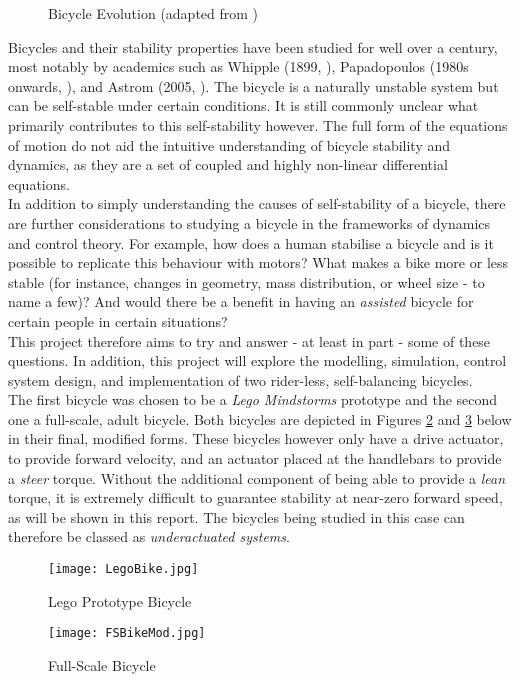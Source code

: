 \begin{figure}[H]
	\centering
    \def\svgwidth{0.9\textwidth}
    
    \caption{Bicycle Evolution (adapted from \cite{bikeevo})}
	\label{fig:bikeevo}
\end{figure}

Bicycles and their stability properties have been studied for well over a century, most notably by academics such as Whipple (1899, \cite{whipple}), Papadopoulos (1980s onwards, \cite{papadopoulos}), and Astrom (2005, \cite{astrom}). The bicycle is a naturally unstable system but can be self-stable under certain conditions. It is still commonly unclear what primarily contributes to this self-stability however. The full form of the equations of motion do not aid the intuitive understanding of bicycle stability and dynamics, as they are a set of coupled and highly non-linear differential equations. \\

\noindent In addition to simply understanding the causes of self-stability of a bicycle, there are further considerations to studying a bicycle in the frameworks of dynamics and control theory. For example, how does a human stabilise a bicycle and is it possible to replicate this behaviour with motors? What makes a bike more or less stable (for instance, changes in geometry, mass distribution, or wheel size - to name a few)? And would there be a benefit in having an \textit{assisted} bicycle for certain people in certain situations? \\

\noindent This project therefore aims to try and answer - at least in part - some of these questions. In addition, this project will explore the modelling, simulation, control system design, and implementation of two rider-less, self-balancing bicycles. \\

The first bicycle was chosen to be a \textit{Lego Mindstorms} prototype and the second one a full-scale, adult bicycle. Both bicycles are depicted in Figures \ref{fig:lego} and \ref{fig:fs} below in their final, modified forms. These bicycles however only have a drive actuator, to provide forward velocity, and an actuator placed at the handlebars to provide a \textit{steer} torque. Without the additional component of being able to provide a \textit{lean} torque, it is extremely difficult to guarantee stability at near-zero forward speed, as will be shown in this report. The bicycles being studied in this case can therefore be classed as \textit{underactuated systems}.

\vfill

\begin{figure}[h]
\centering
\texttt{[image: LegoBike.jpg]}
\caption{Lego Prototype Bicycle}
\label{fig:lego}
\end{figure}

\begin{figure}[h]
\centering
\texttt{[image: FSBikeMod.jpg]}
\caption{Full-Scale Bicycle}
\label{fig:fs}
\end{figure}

\newpage